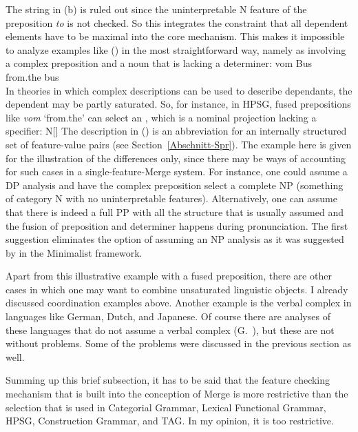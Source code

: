 The string in (b) is ruled out since the uninterpretable N feature of the preposition
\emph{to} is not checked. So this integrates the constraint that all
dependent elements have to be maximal into the core mechanism. This makes it impossible to analyze examples like ()
in the most straightforward way, namely as involving a complex preposition and a noun that is lacking
a determiner:
\ea
\gll vom Bus\\
     from.the bus\\
\z
In theories in which complex descriptions can be used to describe dependants, the dependent may be
partly saturated. So, for instance, in HPSG, fused prepositions like \emph{vom} `from.the' can select an \nbar,
which is a nominal projection lacking a specifier:
\ea
N[\spr {}]
\z
The description in () is an abbreviation for an internally structured set of feature-value
pairs (see Section~\ref{Abschnitt-Spr}). The example here is given for the illustration of the
differences only, since there may be ways of accounting for such cases in a single-feature-Merge
system. For instance, one could assume a DP analysis and have the complex preposition select a complete NP
(something of category N with no uninterpretable features). Alternatively, one can assume that there is indeed a full PP
with all the structure that is usually assumed and the fusion of preposition and determiner happens
during pronunciation. The first suggestion eliminates the option of assuming an NP analysis as it
was suggested by \citet{Bruening2009a} in the Minimalist framework.

\addlines[-1]
Apart from this illustrative example with a fused preposition, there are other cases in which one may want to combine unsaturated
linguistic objects. I already discussed coordination examples above. Another example is the verbal
complex in languages like German, Dutch, 
and Japanese. 
Of course there are analyses of these languages
that do not assume a verbal complex (G.\ \citealp{GMueller98a,Wurmbrand2003b}), but these are not without problems. Some of the problems were
discussed in the previous section as well.

Summing up this brief subsection, it has to be said that the feature checking mechanism that is
built into the conception of Merge is more restrictive than the selection that is used in Categorial
Grammar, Lexical Functional Grammar, HPSG, Construction Grammar, and TAG. In my opinion, it is too restrictive.


